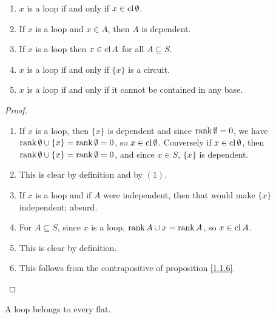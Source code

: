 \begin{proposition}\label{1.3.1}
    \begin{enumerate}[label=(\arabic*)]
        \item $x$ is a loop if and only if  $x \in \operatorname{cl}{\emptyset}$.

        \item If $x$ is a loop and $x \in A$, then  $A$ is dependent.

        \item If $x$ is a loop then  $x \in \operatorname{cl}{A}$ for all $A \subseteq S$.

        \item $x$ is a loop if and only if  $\{x\}$ is a circuit.

        \item $x$ is a loop if and only if it cannot be contained in any base.
    \end{enumerate}
\end{proposition}
\begin{proof}
    \begin{enumerate}[label=(\arabic*)]
        \item If $x$ is a loop, then  $\{x\}$ is dependent and since $\operatorname{rank}{\emptyset}=0$, we have
            $\operatorname{rank}{\emptyset \cup \{x\}}=\operatorname{rank}{\emptyset}=0$, so $x \in \operatorname{cl}{\emptyset}$. Conversely
            if $x \in \operatorname{cl}{\emptyset}$, then $\operatorname{rank}{\emptyset \cup \{x\}}=\operatorname{rank}{\emptyset}=0$, and
            since $x \in S$, $\{x\}$ is dependent.

        \item This is clear by definition and by $(1)$.

        \item If $x$ is a loop and if  $A$ were independent, then that would make  $\{x\}$ 
            independent; absurd.

        \item For $A \subseteq S$, since  $x$ is a loop,  $\operatorname{rank}{A \cup x}=\operatorname{rank}{A}$, so $x \in
            \operatorname{cl}{A}$.

        \item This is clear by definition.

        \item This follows from the contrapositive of proposition \ref{1.1.6}.
    \end{enumerate}
\end{proof}
\begin{corollary}
    A loop belongs to every flat.		
\end{corollary}
